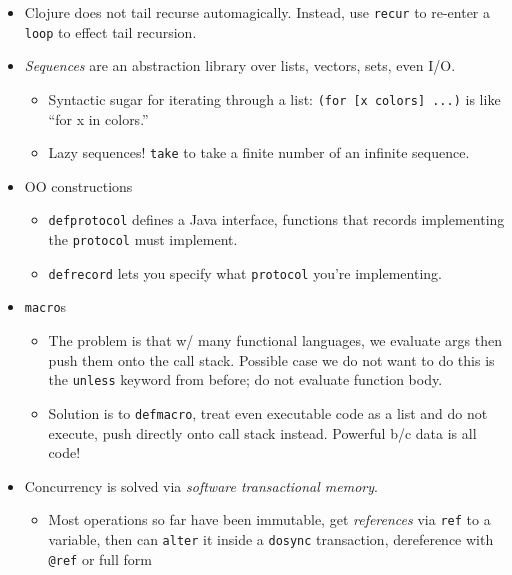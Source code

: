 \documentclass[10pt]{article}
\begin{document}
\begin{itemize}
    \item Clojure does not tail recurse automagically. Instead, use
        \lstinline{recur} to re-enter a \lstinline{loop} to effect tail
        recursion.
    \item \emph{Sequences} are an abstraction library over lists, vectors, sets,
        even I/O.
        \begin{itemize}
            \item Syntactic sugar for iterating through a list:
                \lstinline{(for [x colors] ...)} is like ``for x in colors.''
            \item Lazy sequences! \lstinline{take} to take a finite number of an
                infinite sequence.
        \end{itemize}
    \item OO constructions
        \begin{itemize}
            \item \lstinline{defprotocol} defines a Java interface, functions
                that records implementing the \lstinline{protocol} must implement.
            \item \lstinline{defrecord} lets you specify what
                \lstinline{protocol} you're implementing.
        \end{itemize}
    \item \lstinline{macro}s
        \begin{itemize}
            \item The problem is that w/ many functional languages, we evaluate
                args then push them onto the call stack. Possible case we do not
                want to do this is the \lstinline{unless} keyword from before;
                do not evaluate function body.
            \item Solution is to \lstinline{defmacro}, treat even executable
                code as a list and do not execute, push directly onto call
                stack instead. Powerful b/c data is all code!
        \end{itemize}
    \item Concurrency is solved via \emph{software transactional memory}.
        \begin{itemize}
            \item Most operations so far have been immutable, get
                \emph{references} via \lstinline{ref} to a variable, then can
                \lstinline{alter} it inside a \lstinline{dosync} transaction,
                dereference with \lstinline{@ref} or full form

\end{itemize}
\end{itemize}
\end{document}
